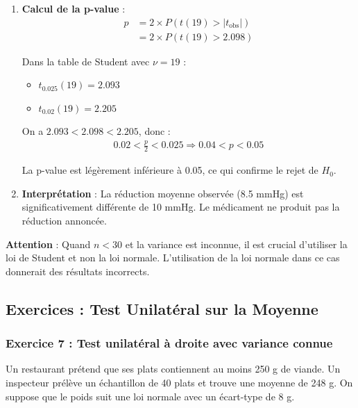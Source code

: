\documentclass[11pt,a4paper]{article}
\begin{document}
\begin{enumerate}
    \item \textbf{Calcul de la p-value} :
    \begin{align*}
    p &= 2 \times P(t(19) > |t_{\text{obs}}|) \\
    &= 2 \times P(t(19) > 2.098)
    \end{align*}
    
    Dans la table de Student avec $\nu = 19$ :
    \begin{itemize}
        \item $t_{0.025}(19) = 2.093$
        \item $t_{0.02}(19) = 2.205$
    \end{itemize}
    
    On a $2.093 < 2.098 < 2.205$, donc :
    \begin{align*}
    0.02 < \frac{p}{2} < 0.025 \Rightarrow 0.04 < p < 0.05
    \end{align*}
    
    La p-value est légèrement inférieure à 0.05, ce qui confirme le rejet de $H_0$.
    
    \item \textbf{Interprétation} : La réduction moyenne observée (8.5 mmHg) est significativement différente de 10 mmHg. Le médicament ne produit pas la réduction annoncée.
\end{enumerate}

\begin{attentionbox}
\textbf{Attention} : Quand $n < 30$ et la variance est inconnue, il est crucial d'utiliser la loi de Student et non la loi normale. L'utilisation de la loi normale dans ce cas donnerait des résultats incorrects.
\end{attentionbox}

\newpage

\subsection{Exercices : Test Unilatéral sur la Moyenne}

\subsubsection{Exercice 7 : Test unilatéral à droite avec variance connue}

Un restaurant prétend que ses plats contiennent au moins 250 g de viande. Un inspecteur prélève un échantillon de 40 plats et trouve une moyenne de 248 g. On suppose que le poids suit une loi normale avec un écart-type de 8 g.
\end{document}
